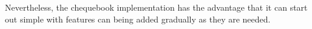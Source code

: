 Nevertheless, the chequebook implementation has the advantage that it can start out simple with features can being added gradually as they are needed.



% 
% 
% 
% 
% 

